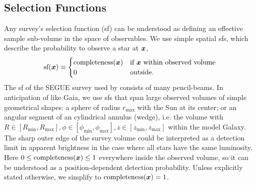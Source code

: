 \subsection{Selection Functions} \label{sec:selectionfunction}

Any survey's selection function (sf) can be understood as defining an effective sample sub-volume in the space of observables. We use simple spatial sfs, which describe the probability to observe a star at $\boldsymbol{x}$,
\begin{eqnarray*}
\text{sf}(\boldsymbol{x}) \equiv \begin{cases}
\text{completeness}(\boldsymbol{x}) &\text{if $\boldsymbol{x}$ within observed volume}\\
0 & \text{outside.}
\end{cases}
\end{eqnarray*}
The sf of the SEGUE survey  used by \citet{2013ApJ...779..115B} consists of many pencil-beams. In anticipation of  like Gaia, we use sfs that span large observed volumes of simple geometrical shapes: a sphere of radius $r_\text{max}$ with the Sun at its center; or an angular segment of an cylindrical annulus (wedge), i.e. the volume with $R \in [R_\text{min},R_\text{max}],\phi \in [\phi_\text{min},\phi_\text{max}],z \in [z_\text{min},z_\text{max}]$ within the model Galaxy. The sharp outer edge of the survey volume could be interpreted as a detection limit in apparent brightness in the case where all stars have the same luminosity. Here $0 \leq \text{completeness}(\boldsymbol{x}) \leq 1$ everywhere inside the observed volume, so it can be understood as a position-dependent detection probability. Unless explicitly stated otherwise, we simplify to $\text{completeness}(\boldsymbol{x}) = 1$.
